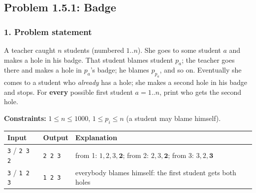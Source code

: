 \subsection{Problem 1.5.1: Badge}


\subsubsection*{1. Problem statement}

A teacher caught $n$ students (numbered $1..n$). She goes to some student $a$ and makes a hole in his badge. That student blames student $p_a$; the teacher goes there and makes a hole in $p_a$'s badge; he blames $p_{p_a}$, and so on. Eventually she comes to a student who \emph{already} has a hole; she makes a second hole in his badge and stops. For \textbf{every} possible first student $a = 1..n$, print who gets the second hole.

\textbf{Constraints:} $1 \le n \le 1000$, \; $1 \le p_i \le n$ (a student may blame himself).

\begin{table}[H]
\centering\small
\begin{tabular}{@{}lll@{}}
\toprule
\textbf{Input} & \textbf{Output} & \textbf{Explanation} \\
\midrule
\texttt{3} / \texttt{2 3 2} & \texttt{2 2 3} & from 1: $1,2,3,\mathbf{2}$; from 2: $2,3,\mathbf{2}$; from 3: $3,2,\mathbf{3}$ \\
\texttt{3} / \texttt{1 2 3} & \texttt{1 2 3} & everybody blames himself: the first student gets both holes \\
\bottomrule
\end{tabular}
\end{table}


